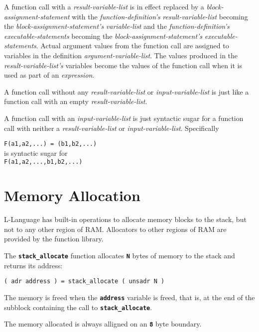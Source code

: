 \documentclass[12pt]{article}
\makeatletter
\newcommand{\TT}[1]{{\tt \bfseries #1}}
\newcommand{\ttkey}[1]{\TT{#1}\index{#1@{\tt #1}}}
\newenvironment{indpar}[1][0.3in]%
	{\begin{list}{}%
		     {\setlength{\itemsep}{0in}%
		      \setlength{\topsep}{0in}%
		      \setlength{\parsep}{1ex}%
		      \setlength{\labelwidth}{#1}%
		      \setlength{\leftmargin}{#1}%
		      \addtolength{\leftmargin}{\labelsep}}%
	 \item}%
	{\end{list}}
\makeatother
\begin{document}
A function call with a {\em result-variable-list}
is in effect replaced by a {\em block-assignment-statement}
with the {\em function-definition's} {\em result-variable-list} becoming the 
{\em block-assignment-statement's} {\em variable-list} and the
{\em function-definition's} {\em executable-statements} becoming the 
{\em block-assignment-statement's} {\em executable-statements}.
Actual argument values from the function call are assigned to variables in
the definition {\em argument-variable-list}.  The values produced in
the {\em result-variable-list's} variables become the values of the
function call when it is used as part of an {\em expression}.

A function call without any {\em result-variable-list} or
{\em input-variable-list} is just like a function call with an empty
{\em result-variable-list}.

A function call with an {\em input-variable-list} is just syntactic
sugar for a function call with neither a {\em result-variable-list}
or {\em input-variable-list}.  Specifically
\begin{center}
{\tt F(a1,a2,...)~=~(b1,b2,...)} \\
is syntactic sugar for \\
{\tt F(a1,a2,...,b1,b2,...)} \\
\end{center}

\section{Memory Allocation}
\label{-MEMORY-ALLOCATION}

L-Language has built-in operations to allocate memory blocks to the
stack, but not to any other region of RAM.  Allocators to other
regions of RAM are provided by the function library.

The \ttkey{stack\_allocate} function allocates \TT{N} bytes of
memory to the stack and returns its address:

\begin{indpar}\begin{verbatim}
( adr address ) = stack_allocate ( unsadr N )
\end{verbatim}\end{indpar}

The memory is freed when the \TT{address} variable is freed, that is,
at the end of the subblock containing the call to \TT{stack\_allocate}.

The memory allocated is always alligned on an \TT{8} byte boundary.
\end{document}
